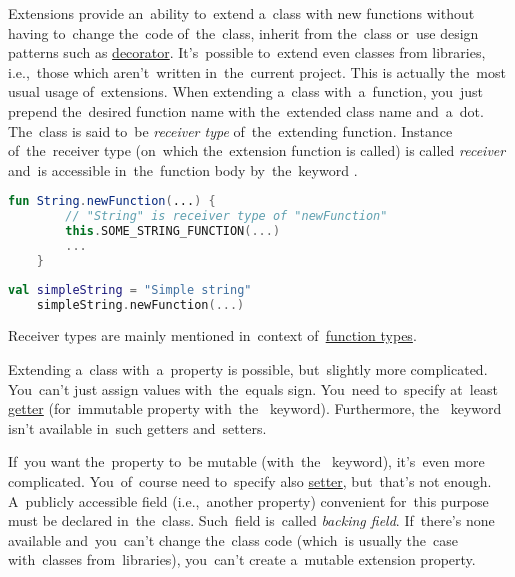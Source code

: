 \label{kotlinextension}
Extensions provide an~ability to~extend a~class with new functions without having to~change the~code of~the~class, inherit from the~class or~use design patterns such as \hyperref[decoratordp]{decorator}.
It's~possible to~extend even classes from libraries, i.e.,~those which aren't~written in~the~current project.
This is actually the~most usual usage of~extensions.
When extending a~class with~a~function, you~just prepend the~desired function name with the~extended class name and~a~dot.
The~class is said to~be \textit{receiver type} of~the~extending function.
Instance of~the~receiver type (on~which the~extension function is called) is called \textit{receiver} and~is accessible in~the~function body by~the~keyword .

\begin{lstlisting}[language=Kotlin, title={Extension definition}]
    fun String.newFunction(...) {
        // "String" is receiver type of "newFunction"
        this.SOME_STRING_FUNCTION(...)
        ...
    }
\end{lstlisting}
\newpage

\begin{lstlisting}[language=Kotlin, title={Usage}]
    val simpleString = "Simple string"
    simpleString.newFunction(...)
\end{lstlisting}

\note Receiver types are mainly mentioned in~context of~\hyperref[kotlinanonymousreceivertype]{function types}.

\label{kotlinextensionproperty}
\noindent Extending a~class with~a~property is possible, but~slightly more complicated.
You~can't just assign values with~the~equals sign.
You~need to~specify at~least \hyperref[kotlingetset]{getter} (for~immutable property \mbox{with the } keyword).
Furthermore, \mbox{the \hyperref[kotlingetset]{}} keyword isn't available in~such getters and~setters.

If~you want the~property to~be mutable (\mbox{with the } keyword), it's~even more complicated.
You~of~course need to~specify also \hyperref[kotlingetset]{setter}, but~that's not enough.
A~publicly accessible field (i.e.,~another property) convenient for~this purpose must be declared in~the~class.
Such~field is~called \textit{backing field}.
If~there's none available and~you~can't change the~class code (which~is usually the~case with~classes from~libraries), you~can't create a~mutable extension property.

